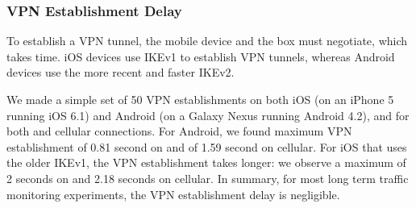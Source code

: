 \subsubsection{VPN Establishment Delay}
To establish a VPN tunnel, the mobile device and the \platname{} box
must negotiate, which takes time. iOS devices use IKEv1 to establish VPN
tunnels, whereas Android devices use the more recent and faster IKEv2.


We made a simple set of 50 VPN establishments on both iOS (on an
iPhone 5 running iOS 6.1) and Android (on a Galaxy Nexus running
Android 4.2), and for both \wifi{} and cellular connections. For
Android, we found maximum VPN establishment of 0.81 second on \wifi{}
and of 1.59 second on cellular. For iOS that uses the older IKEv1, the
VPN establishment takes longer: we observe a maximum of 2 seconds on
\wifi{} and 2.18 seconds on cellular.  In summary, for most long term
traffic monitoring experiments, the VPN establishment delay is
negligible.




